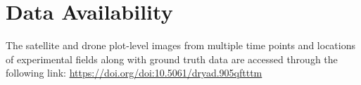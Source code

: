 \documentclass[12pt,twoside]{gsag3jnl}
\begin{document}
\section{Data Availability}
The satellite and drone plot-level images from multiple time points and locations of experimental fields along with ground truth data are accessed through the following link: \url{https://doi.org/doi:10.5061/dryad.905qftttm}










\end{document}
